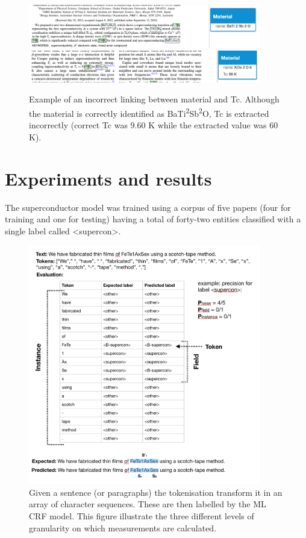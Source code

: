 \documentclass{article}[a4]
\begin{document}
\begin{figure}[h]
    \centering
    \includegraphics[width=4in]{example-bad1} 
    \includegraphics[width=4in]{example-bad2}
    \caption{Example of an incorrect linking between material and Tc. Although the material is correctly identified as BaTi\textsuperscript{2}Sb\textsuperscript{2}O, Tc is extracted incorrectly (correct Tc was 9.60 K while the extracted value was 60 K). }
    \label{fig:example-not-working}
\end{figure}

\section{Experiments and results}
\label{sec:experiments-results}


The superconductor model was trained using a corpus of five papers (four for training and one for testing) having a total of forty-two entities classified with a single label called  \textless supercon\textgreater.

\begin{figure}[h!]
    \centering
    \includegraphics[width=4in]{example-output}
    \caption{Given a sentence (or paragraphs) the tokenisation transform it in an array of character sequences. These are then labelled by the ML CRF model. This figure illustrate the three different levels of granularity on which measurements are calculated.}
    \label{fig:levels-measurement}
\end{figure}
\end{document}
